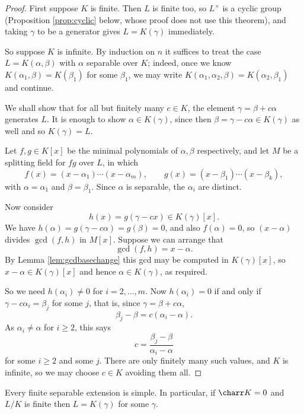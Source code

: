 \begin{proof}
	First suppose $K$ is finite. Then $L$ is finite too, so $L^\times$ is a cyclic group (Proposition \ref{prop:cyclic} below, whose proof does not use this theorem), and taking $\gamma$ to be a generator gives $L = K(\gamma)$ immediately.

	So suppose $K$ is infinite. By induction on $n$ it suffices to treat the case $L = K(\alpha, \beta)$ with $\alpha$ separable over $K$; indeed, once we know $K(\alpha_1, \beta) = K(\beta_1)$ for some $\beta_1$, we may write $K(\alpha_1,\alpha_2,\beta) = K(\alpha_2, \beta_1)$ and continue.

	We shall show that for all but finitely many $c \in K$, the element $\gamma = \beta + c\alpha$ generates $L$. It is enough to show $\alpha \in K(\gamma)$, since then $\beta = \gamma - c\alpha \in K(\gamma)$ as well and so $K(\gamma) = L$.

	Let $f, g \in K[x]$ be the minimal polynomials of $\alpha, \beta$ respectively, and let $M$ be a splitting field for $fg$ over $L$, in which
	$$f(x) = (x-\alpha_1)\cdots(x-\alpha_m), \qquad g(x) = (x-\beta_1)\cdots(x-\beta_k),$$
	with $\alpha = \alpha_1$ and $\beta = \beta_1$. Since $\alpha$ is separable, the $\alpha_i$ are distinct.

	Now consider
	$$h(x) = g(\gamma - cx) \in K(\gamma)[x].$$
	We have $h(\alpha) = g(\gamma - c\alpha) = g(\beta) = 0$, and also $f(\alpha) = 0$, so $(x-\alpha)$ divides $\gcd(f,h)$ in $M[x]$. Suppose we can arrange that
	$$\gcd(f,h) = x - \alpha.$$
	By Lemma \ref{lem:gcdbasechange} this gcd may be computed in $K(\gamma)[x]$, so $x - \alpha \in K(\gamma)[x]$ and hence $\alpha \in K(\gamma)$, as required.

	So we need $h(\alpha_i) \neq 0$ for $i = 2, \dots, m$. Now $h(\alpha_i) = 0$ if and only if $\gamma - c\alpha_i = \beta_j$ for some $j$, that is, since $\gamma = \beta + c\alpha$,
	$$\beta_j - \beta = c(\alpha_i - \alpha).$$
	As $\alpha_i \neq \alpha$ for $i \geq 2$, this says
	$$c = \frac{\beta_j - \beta}{\alpha_i - \alpha}$$
	for some $i \geq 2$ and some $j$. There are only finitely many such values, and $K$ is infinite, so we may choose $c \in K$ avoiding them all.
\end{proof}

\begin{corollary}
	Every finite separable extension is simple. In particular, if $\charr K = 0$ and $L/K$ is finite then $L = K(\gamma)$ for some $\gamma$.
\end{corollary}

